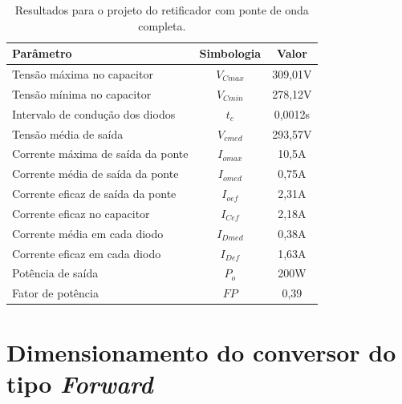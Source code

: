 \begin{apendicesenv}
\begin{table}[H]
    \centering
    \caption{Resultados para o projeto do retificador com ponte de onda completa.}
    \label{retificador_resultados}
    \begin{adjustbox}{max width = \textwidth}
        \begin{tabular}{|l|c|c|}
            \hline
            \rowcolor[HTML]{A8DADC}
            \textbf{Parâmetro} & \textbf{Simbologia} & \textbf{Valor}
            \\ \hline
            Tensão máxima no capacitor & $V_{Cmax}$ &  309,01V
             \\ \hline
            Tensão mínima no capacitor & $V_{Cmin}$ &  278,12V
             \\ \hline
            Intervalo de condução dos diodos & $t_{c}$ &  0,0012s
             \\ \hline
            Tensão média de saída & $V_{cmed}$ & 293,57V
             \\ \hline
            Corrente máxima de saída da ponte & $I_{omax}$ & 10,5A
             \\ \hline
            Corrente média de saída da ponte & $I_{omed}$ &  0,75A
             \\ \hline
            Corrente eficaz de saída da ponte & $I_{oef}$ & 2,31A
             \\ \hline
            Corrente eficaz no capacitor & $I_{Cef}$ &  2,18A
             \\ \hline
            Corrente média em cada diodo & $I_{Dmed}$ &  0,38A
             \\ \hline
            Corrente eficaz em cada diodo & $I_{Def}$ & 1,63A
             \\ \hline
            Potência de saída & $P_{o}$ &  200W
             \\ \hline
            Fator de potência & $FP$ &  0,39
             \\ \hline
        \end{tabular}
    \end{adjustbox}
\end{table}

\section{Dimensionamento do conversor do tipo \textit{Forward}}


\end{apendicesenv}
